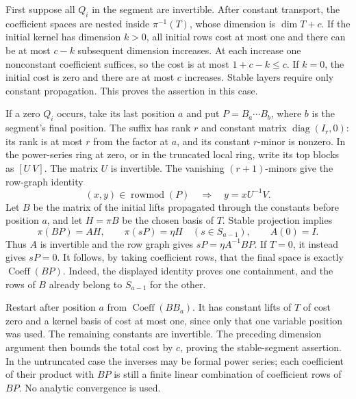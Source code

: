 First suppose all $Q_i$ in the segment are invertible.
After constant transport, the coefficient spaces are nested
inside $\pi^{-1}(T)$, whose dimension is $\dim T+c$.
If the initial kernel has dimension $k>0$, all initial rows
cost at most one and there can be at most $c-k$ subsequent
dimension increases.  At each increase one nonconstant
coefficient suffices, so the cost is at most
$1+c-k\le c$.  If $k=0$, the initial cost is zero and
there are at most $c$ increases.  Stable layers require only
constant propagation.  This proves the assertion in this case.

If a zero $Q_i$ occurs, take its last position $a$ and put
$P=B_a\cdots B_b$, where $b$ is the segment's final position.
The suffix has rank $r$ and constant matrix
$\operatorname{diag}(I_r,0)$: its rank is at most $r$ from
the factor at $a$, and its constant $r$-minor is nonzero.
In the power-series ring at zero, or in the truncated local
ring, write its top blocks as $[U\ V]$.  The matrix $U$
is invertible.  The vanishing $(r+1)$-minors give the row-graph
identity
\[
 (x,y)\in\operatorname{rowmod}(P)
       \quad\Longrightarrow\quad y=xU^{-1}V.
\]
Let $B$ be the matrix of the initial lifts propagated through
the constants before position $a$, and let $H=\pi B$ be the
chosen basis of $T$.  Stable projection implies
\[
 \pi(BP)=AH,\qquad \pi(sP)=\eta H\quad(s\in S_{a-1}),
 \qquad A(0)=I.
\]
Thus $A$ is invertible and the row graph gives
$sP=\eta A^{-1}BP$.  If $T=0$, it instead gives $sP=0$.
It follows, by taking coefficient rows, that the final space
is exactly $\operatorname{Coeff}(BP)$.  Indeed, the displayed
identity proves one containment, and the rows of $B$ already
belong to $S_{a-1}$ for the other.

Restart after position $a$ from
$\operatorname{Coeff}(BB_a)$.  It has constant lifts of $T$
of cost zero and a kernel basis of cost at most one, since
only that one variable position was used.  The remaining
constants are invertible.  The preceding dimension argument
then bounds the total cost by $c$, proving the stable-segment
assertion.  In the untruncated case the inverses may be formal
power series; each coefficient of their product with $BP$
is still a finite linear combination of coefficient rows of
$BP$.  No analytic convergence is used.

